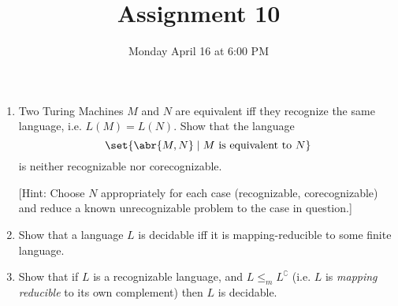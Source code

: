 \documentclass{cs81-homework}
\title{Assignment 10}
\date{Monday April 16 at 6:00 PM}
\author{}
\begin{document}
\begin{introduction}
  \theintroduction
\end{introduction}

\begin{enumerate}
\item {} Two Turing Machines \(M\) and \(N\) are equivalent iff they
  recognize the same language, i.e. \(L(M) = L(N)\).  Show that the language
  \[
    \set{\abr{M, N} \mid \text{\(M\) is equivalent to \(N\)}}
  \]
  is neither recognizable nor corecognizable.

  [Hint: Choose \(N\) appropriately for each case (recognizable, corecognizable)
  and reduce a known unrecognizable problem to the case in question.]

  \begin{solution}
  \end{solution}

\item {} Show that a language \(L\) is decidable iff it is
  mapping-reducible to some finite language.

  \begin{solution}
  \end{solution}

\item {} Show that if \(L\) is a recognizable language, and
  \(L \le_m L^\complement\) (i.e. \(L\) is \emph{mapping reducible} to its own
  complement) then \(L\) is decidable.

  \begin{solution}
  \end{solution}


\end{enumerate}
\end{document}
